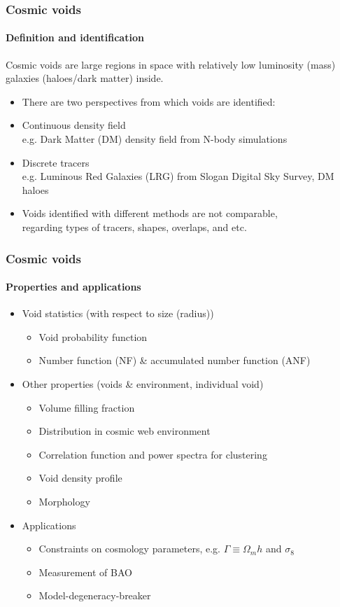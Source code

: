 \documentclass{beamer}
\newtheorem{Narrow down the analysis}{Narrow down the analysis}
\begin{document}
\begin{frame}
  \frametitle{Cosmic voids}
  \framesubtitle{Definition and identification} %
  \pause Cosmic voids are large regions in space with relatively low luminosity (mass) galaxies (haloes/dark matter) inside. 
  \begin{itemize}
    \pause \item[\checkmark] There are two perspectives from which voids are identified:%
    \pause \item Continuous density field\\
    \pause e.g. Dark Matter (DM) density field from N-body simulations
    \pause \item Discrete tracers\\
    \pause e.g. Luminous Red Galaxies (LRG) from Slogan Digital Sky Survey, DM haloes
    \pause \item[\checkmark] Voids identified with different methods are not comparable,\\
    \pause regarding types of tracers, shapes, overlaps, and etc.    
  \end{itemize}
\end{frame}

\begin{frame}
	\frametitle{Cosmic voids}
	\framesubtitle{Properties and applications}
	\begin{itemize}
	\pause \item Void statistics (with respect to size (radius))
		\begin{itemize}
		\pause \item Void probability function
		\pause \item Number function (NF) \& accumulated number function (ANF)
		\end{itemize}
	\pause \item Other properties (voids \& environment, individual void)
		\begin{itemize}
		\pause \item Volume filling fraction
		\pause \item Distribution in cosmic web environment
		\pause \item Correlation function and power spectra for clustering
		\pause \item Void density profile
		\pause \item Morphology
		\end{itemize}
	\pause \item Applications
		\begin{itemize}
		\pause \item Constraints on cosmology parameters, \pause e.g. $\Gamma\equiv\Omega_{m}h$ and $\sigma_{8}$ \citep{Betancort2009}
		\pause \item Measurement of BAO \citep{Liang2015}
		\pause \item Model-degeneracy-breaker \citep{Jennings2013} 
		\end{itemize}
	\end{itemize}
\end{frame}
\end{document}
